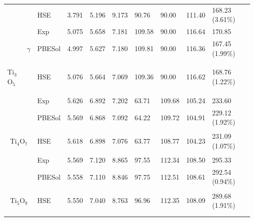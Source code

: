 \begin{table}[ht!]
\begin{tabular}{*{2}{p{}} p{} *{3}{p{}} *{3}{p{}} *{1}{p{}}}
       &               & HSE                      & 3.791    & 5.196    & 9.173    & 90.76                       & 90.00                      & 111.40                      & 168.23 (3.61\%) \\
             \cline{2-10}
      &                & Exp\cite{Hong1982}    & 5.075    & 5.658    & 7.181    & 109.58                      & 90.00                      & 116.64                      & 170.85 \\
     &        $\gamma$ & PBESol                   & 4.997    & 5.627    & 7.180    & 109.81                      & 90.00                      & 116.36                      & 167.45 (1.99\%) \\
   \multirow{-9}{*}{\begin{sideways}Ti${}_3$O${}_5$\end{sideways}} &                  & HSE                      & 5.076    & 5.664    & 7.069    & 109.36                      & 90.00                      & 116.62                      & 168.76 (1.22\%) \\
  \hhline{==========}
 &  &   Exp\cite{LePage1984} & 5.626    & 6.892    & 7.202    & 63.71                       & 109.68                     & 105.24                      & 233.60              \\
 &  &  PBESol               & 5.569    & 6.868    & 7.092    & 64.22                       & 109.72                     & 104.91                      & 229.12 (1.92\%)            \\
 \multicolumn{2}{c}{\multirow{-3}{*}{\begin{sideways}Ti${}_4$O${}_7$\end{sideways}}}  &  HSE                  & 5.618    & 6.898    & 7.076    & 63.77                       & 108.77                     & 104.23                      & 231.09 (1.07\%) \\
  \hhline{==========}
 &  &    Exp\cite{Andersson1960} & 5.569    & 7.120    & 8.865    & 97.55                       & 112.34                     & 108.50                      & 295.33              \\
 &  &   PBESol                  & 5.558    & 7.110    & 8.846    & 97.75                       & 112.51                     & 108.61                      & 292.54 (0.94\%)             \\
 \multicolumn{2}{c}{\multirow{-3}{*}{\begin{sideways}Ti${}_5$O${}_9$\end{sideways}}} &   HSE                     & 5.550    & 7.040    & 8.763    & 96.96                       & 112.35                     & 108.09                      & 289.68 (1.91\%) \\
  \hhline{==========}
   \end{tabular}
 \end{table}

